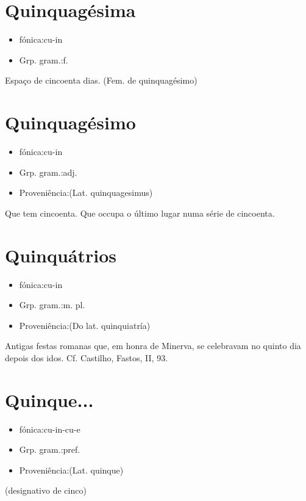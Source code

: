 \section{Quinquagésima}
\begin{itemize}
\item {fónica:cu-in}
\end{itemize}
\begin{itemize}
\item {Grp. gram.:f.}
\end{itemize}
Espaço de cincoenta dias.
(Fem. de \textunderscore quinquagésimo\textunderscore )
\section{Quinquagésimo}
\begin{itemize}
\item {fónica:cu-in}
\end{itemize}
\begin{itemize}
\item {Grp. gram.:adj.}
\end{itemize}
\begin{itemize}
\item {Proveniência:(Lat. \textunderscore quinquagesimus\textunderscore )}
\end{itemize}
Que tem cincoenta.
Que occupa o último lugar numa série de cincoenta.
\section{Quinquátrios}
\begin{itemize}
\item {fónica:cu-in}
\end{itemize}
\begin{itemize}
\item {Grp. gram.:m. pl.}
\end{itemize}
\begin{itemize}
\item {Proveniência:(Do lat. \textunderscore quinquiatría\textunderscore )}
\end{itemize}
Antigas festas romanas que, em honra de Minerva, se celebravam no quinto dia depois dos idos. Cf. Castilho, \textunderscore Fastos\textunderscore , II, 93.
\section{Quinque...}
\begin{itemize}
\item {fónica:cu-in-cu-e}
\end{itemize}
\begin{itemize}
\item {Grp. gram.:pref.}
\end{itemize}
\begin{itemize}
\item {Proveniência:(Lat. \textunderscore quinque\textunderscore )}
\end{itemize}
(designativo de \textunderscore cinco\textunderscore )
